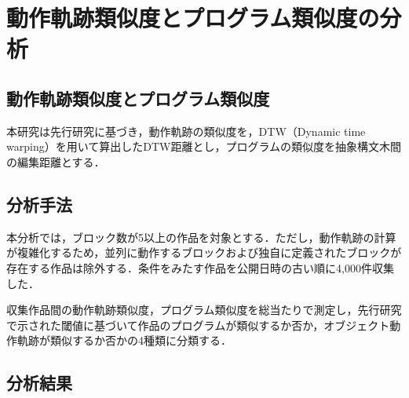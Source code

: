 \documentclass[T,J]{fose} %
\begin{document}
\section{動作軌跡類似度とプログラム類似度の分析}\label{sec:Analysis}

\subsection{動作軌跡類似度とプログラム類似度}\label{sec:Similarity}

本研究は先行研究\cite{Fukuchi2021}\cite{Mikura2022}に基づき，動作軌跡の類似度を，DTW（Dynamic time warping）を用いて算出したDTW距離とし，プログラムの類似度を抽象構文木間の編集距離とする．

\vspace{-10pt}
\subsection{分析手法}
本分析では，ブロック数が5以上の作品を対象とする．ただし，動作軌跡の計算が複雑化するため，並列に動作するブロックおよび独自に定義されたブロックが存在する作品は除外する．条件をみたす作品を公開日時の古い順に4,000件収集した．

収集作品間の動作軌跡類似度，プログラム類似度を総当たりで測定し，先行研究で示された閾値に基づいて作品のプログラムが類似するか否か，オブジェクト動作軌跡が類似するか否かの4種類に分類する．

\vspace{-10pt}
\subsection{分析結果}\label{subsec:result}
\end{document}
